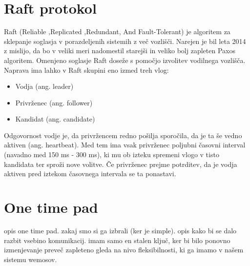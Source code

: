 \documentclass[runningheads]{llncs}
\begin{document}
\section{Raft protokol}
Raft (Reliable ,Replicated ,Redundant, And Fault-Tolerant) je algoritem za sklepanje soglasja v porazdeljenih sistemih z več vozlišči. Narejen je bil leta 2014 z mislijo, da bo v veliki meri nadomestil starejši in veliko bolj zapleten Paxos algoritem. Omenjeno soglasje Raft doseže s pomočjo izvolitev vodilnega vozlišča. Naprava ima lahko v Raft skupini eno izmed treh vlog: \\
\begin{itemize}
\item Vodja (ang. leader)
\item Privrženec (ang. follower)
\item Kandidat (ang. candidate)
\end{itemize}
Odgovornost vodje je, da privržencem redno pošilja sporočila, da je ta še vedno aktiven (ang. heartbeat). Med tem ima vsak privrženec poljubni časovni interval (navadno med 150 ms - 300 ms), ki mu ob izteku spremeni vlogo v tisto kandidata ter sproži nove volitve. Če privrženec prejme potrditev, da je vodja aktiven pred iztekom časovnega intervala se ta ponastavi. 



\section{One time pad}
opis one time pad. zakaj smo si ga izbrali (ker je simple). opis kako bi se dalo razbit vsebino komunikacij. imam samo en stalen ključ, ker bi bilo ponovno izmenjevanje preveč zapleteno gleda na nivo fleksibilnosti, ki ga imamo v našem sistemu wemosov.
\end{document}
